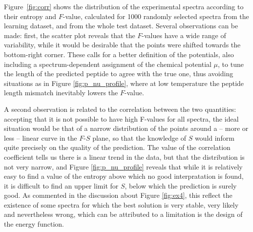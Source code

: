 % 

Figure~\ref{fig:corr} shows the distribution of the experimental spectra according to their entropy and $F$-value, calculated for 1000 randomly selected spectra from the learning dataset, and from the whole test dataset.
Several observations can be made: first, the scatter plot reveals that the $F$-values have a wide range of variability, while it would be desirable that the points were shifted towards the bottom-right corner. These calls for a better definition of the potentials, also including a spectrum-dependent assignment of the chemical potential $\mu$, to tune the length of the predicted peptide to agree with the true one, thus avoiding situations as in Figure \ref{fig:p_nu_profile}, where at low temperature the peptide length mismatch  inevitably lowers the $F$-value.

A second observation is related to the correlation between the two quantities: accepting that it is not possible to have high F-values for all spectra, the ideal situation would be that of a narrow distribution of the points around  a -- more or less -- linear curve in the $F$-$S$ plane, so that the knowledge of $S$ would inform quite precisely on the quality of the prediction. The value of the correlation coefficient tells us there is a linear trend in the data, but that the distribution is not very narrow, and  Figure  \ref{fig:p_nu_profile} reveals that while it is relatively easy to find a value of the entropy above which no good interpratation is found, it is difficult to find an upper limit for $S$, below which the prediction is surely good. As commented in the discussion about Figure \ref{fig:ex4}, this reflect the existence of some spectra for which the best solution is very stable, very likely and nevertheless wrong, which can be attributed to a limitation is the design of the energy function. 

